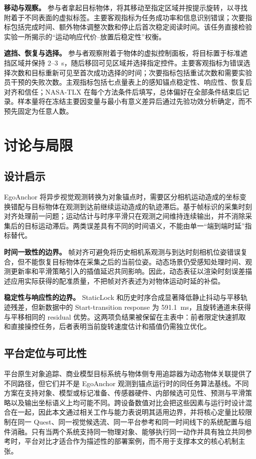 \documentclass[review]{vgtc}
\begin{document}
\textbf{移动与观察。} 参与者拿起目标物体，将其移动至指定区域并按提示旋转，以寻找附着于不同表面的虚拟标签。主要客观指标为任务成功率和信息识别错误；次要指标包括完成时间、额外物体调整次数和停止后首次稳定阅读时间。该任务直接检验实验一所揭示的“运动响应代价--放置后稳定性”权衡。

\textbf{遮挡、恢复与选择。} 参与者观察附着于物体的虚拟控制面板，将目标置于标准遮挡区域并保持 2--3~s，随后移回可见区域并选择指定控件。主要客观指标为错误选择次数和目标重新可见至首次成功选择的时间；次要指标包括重试次数和需要实验员干预的失败次数。主观指标包括七点量表上的感知锚点稳定性、响应性、恢复后对齐和信任；NASA-TLX 在每个方法条件后填写，总体偏好在全部条件结束后记录。样本量将在冻结主要因变量与最小有意义差异后通过先验功效分析确定，而不预先固定为任意人数。

\section{讨论与局限}\label{sec:discussion}


\subsection{设计启示}


EgoAnchor 将异步视觉观测转换为对象锚点时，需要区分相机运动造成的坐标变换错配与目标物体在观测到达前继续运动造成的轨迹滞后。基于帧标识的采集时刻对齐处理前一问题；运动估计与时序平滑只在观测之间维持连续输出，并不消除采集后的目标运动滞后。两类误差具有不同的时间语义，不能由单一“端到端时延”指标替代。

\textbf{时间一致性的边界。} 帧对齐可避免将历史相机系观测与到达时刻相机位姿错误复合，但不能恢复目标物体在采集之后的当前位姿。动态场景仍受感知处理时间、观测更新率和平滑策略引入的插值延迟共同影响。因此，动态表征以渲染时刻误差描述应用实际获得的配准质量，不把帧对齐表述为对物体运动时延的补偿。

\textbf{稳定性与响应性的边界。} StaticLock 和历史时序合成显著降低静止抖动与平移轨迹残差，但新数据中的 Start-transition response 为 591.1~ms，且旋转通道未获得与平移相同的 residual 优势。这两项负结果被保留在主表中：前者限定快速抓取和直接操控任务，后者表明当前旋转速度估计和插值仍需独立优化。

\subsection{平台定位与可比性}

平台原生对象追踪、商业模型目标系统与物体侧专用追踪器为动态物体关联提供了不同路径，但它们并不是 EgoAnchor 观测到锚点运行时的同任务算法基线。不同方案在支持对象、模型或标记准备、传感器硬件、内部候选可见性、预测与平滑策略以及输出坐标语义上均可能不同。跨设备数值对比会把这些因素与运行时设计混合在一起，因此本文通过相关工作与能力表说明其适用边界，并将核心定量比较限制在同一 Quest、同一视觉候选流、同一平台参考和同一时间线下的系统配置与组件消融。只有当两个系统支持同一物理对象、能够执行同一动作并具有独立共同参考时，平台对比才适合作为描述性的部署案例，而不用于支撑本文的核心机制主张。
\end{document}
